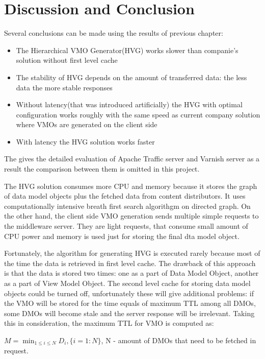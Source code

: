 \newpage
\section{Discussion and Conclusion}
	
Several conclusions can be made using the results of previous chapter: 

\begin{itemize}
	\item The Hierarchical VMO Generator(HVG) works slower than companie's solution without first level cache
	\item The stability of HVG depends on the amount of transferred data: the less data the more stable responses
	\item Without latency(that was introduced artificially) the HVG with optimal configuration works roughly with the same speed as current company solution where VMOs are generated on the client side
	\item With latency the HVG solution works faster 
\end{itemize}

The \cite{VarnApacheReverse} gives the detailed evaluation of Apache Traffic server and Varnish server as a result the comparison between them is omitted in this project. 

The HVG solution consumes more CPU and memory because it stores the graph of data model objects plus the fetched data from content distributors. It uses computationally intensive breath first search algorithgm on directed graph. On the other hand, the client side VMO generation sends multiple simple requests to the middleware server. They are light requests, that consume small amount of CPU power and memory is used just for storing the final dta model object.

Fortunately, the algorithm for generating HVG is executed rarely because most of the time the data is retrieved in first level cache. The drawback of this approach is that the data is stored two times: one as a part of Data Model Object, another as a part of View Model Object. The second level cache for storing data model objects could be turned off, unfortunately these will give additional problems: if the VMO will be stored for the time equals of maximum TTL among all DMOs, some DMOs will become stale and the server response will be irrelevant. Taking this in consideration, the maximum TTL for VMO is computed as:

\begin{center}
	\begin{math}M = \min_{1 \leq i \leq N} D_{i},\{i=1:N\}\end{math}, N - amount of DMOs that need to be fetched in request.
\end{center}

